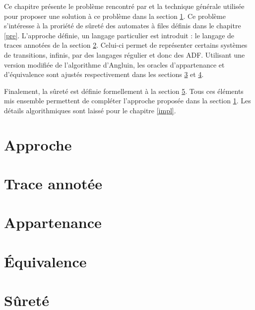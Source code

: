 Ce chapitre présente le problème rencontré par \cite{Vardhan04} et la technique générale utilisée pour proposer une solution à ce problème dans la section \ref{app}. Ce problème s'intéresse à la proriété de sûreté des automates à files définis dans le chapitre \ref{pre}. L'approche définie, un langage particulier est introduit : le langage de traces annotées de la section \ref{trace}. Celui-ci permet de représenter certains systèmes de transitions, infinis, par des langages régulier et donc des ADF. Utilisant une version modifiée de l'algorithme d'Angluin, les oracles d'appartenance et d'équivalence sont ajustés respectivement dans les sections \ref{mem} et \ref{eq}.

Finalement, la sûreté est définie formellement à la section \ref{safety}. Tous ces éléments mis ensemble permettent de compléter l'approche proposée dans la section \ref{app}. Les détails algorithmiques sont laissé pour le chapitre \ref{impl}.


\section{Approche}\label{app}
\section{Trace annotée}\label{trace}
\section{Appartenance}\label{mem}
\section{Équivalence}\label{eq}
\section{Sûreté}\label{safety}
